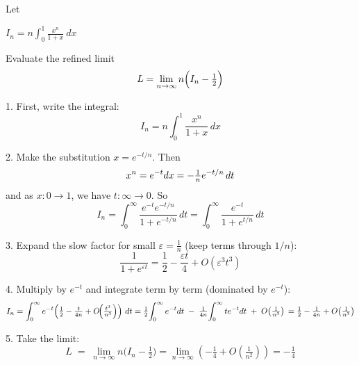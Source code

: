 Let

$ I_n = n\int_{0}^{1}\frac{x^{n}}{1+x}\ dx $

Evaluate the refined limit
$$
L = \lim_{n \to \infty} n\Bigl(I_n - \tfrac{1}{2}\Bigr)
$$

1. First, write the integral:
$$
I_n = n \int_{0}^{1} \frac{x^n}{1+x}\,dx
$$

2. Make the substitution $x = e^{-t/n}$. Then
$$
x^n = e^{-t} \\
dx = -\tfrac{1}{n} e^{-t/n}\,dt
$$
and as $x:0 \to 1$, we have $t:\infty \to 0$. So
$$
I_n = \int_{0}^{\infty} \frac{e^{-t} e^{-t/n}}{1+e^{-t/n}}\,dt
= \int_{0}^{\infty} \frac{e^{-t}}{1+e^{t/n}}\,dt
$$

3. Expand the slow factor for small $\varepsilon=\tfrac{1}{n}$ (keep terms through $1/n$):
$$
\frac{1}{1+e^{\varepsilon t}}
= \frac{1}{2} - \frac{\varepsilon t}{4} + O(\varepsilon^3 t^3)
$$

4. Multiply by $e^{-t}$ and integrate term by term (dominated by $e^{-t}$):
$$
I_n = \int_{0}^{\infty} e^{-t}\!\left(\tfrac{1}{2} - \tfrac{t}{4n} + O\!\Big(\tfrac{t^3}{n^3}\Big)\right)\,dt \\
= \tfrac{1}{2}\!\int_{0}^{\infty} e^{-t}dt \;-\; \tfrac{1}{4n}\!\int_{0}^{\infty} t e^{-t}dt \;+\; O\!\left(\tfrac{1}{n^3}\right) \\
= \tfrac{1}{2} - \tfrac{1}{4n} + O\!\left(\tfrac{1}{n^3}\right)
$$

5. Take the limit:
$$
L \;=\; \lim_{n\to\infty} n\Big(I_n - \tfrac{1}{2}\Big)
= \lim_{n\to\infty}\!\left(-\tfrac{1}{4} + O\!\left(\tfrac{1}{n^2}\right)\right)
= -\tfrac{1}{4}
$$